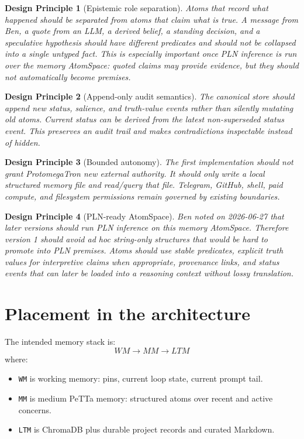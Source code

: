 \documentclass[11pt]{article}
\newtheorem{principle}{Design Principle}
\begin{document}
\begin{principle}[Epistemic role separation]
Atoms that record what happened should be separated from atoms that claim what is
true.  A message from Ben, a quote from an LLM, a derived belief, a standing
decision, and a speculative hypothesis should have different predicates and should
not be collapsed into a single untyped fact.  This is especially important once PLN
inference is run over the memory AtomSpace: quoted claims may provide evidence, but
they should not automatically become premises.
\end{principle}

\begin{principle}[Append-only audit semantics]
The canonical store should append new status, salience, and truth-value events
rather than silently mutating old atoms.  Current status can be derived from the
latest non-superseded status event.  This preserves an audit trail and makes
contradictions inspectable instead of hidden.
\end{principle}

\begin{principle}[Bounded autonomy]
The first implementation should not grant ProtomegaTron new external authority.  It
should only write a local structured memory file and read/query that file.  Telegram,
GitHub, shell, paid compute, and filesystem permissions remain governed by existing
boundaries.
\end{principle}

\begin{principle}[PLN-ready AtomSpace]
Ben noted on 2026-06-27 that later versions should run PLN inference on this memory
AtomSpace.  Therefore version 1 should avoid ad hoc string-only structures that would
be hard to promote into PLN premises.  Atoms should use stable predicates, explicit
truth values for interpretive claims when appropriate, provenance links, and status
events that can later be loaded into a reasoning context without lossy translation.
\end{principle}

\section{Placement in the architecture}

The intended memory stack is:
\[
  WM \rightarrow MM \rightarrow LTM
\]
where:
\begin{itemize}
  \item \texttt{WM} is working memory: pins, current loop state, current prompt tail.
  \item \texttt{MM} is medium PeTTa memory: structured atoms over recent and active
        concerns.
  \item \texttt{LTM} is ChromaDB plus durable project records and curated Markdown.
\end{itemize}
\end{document}
